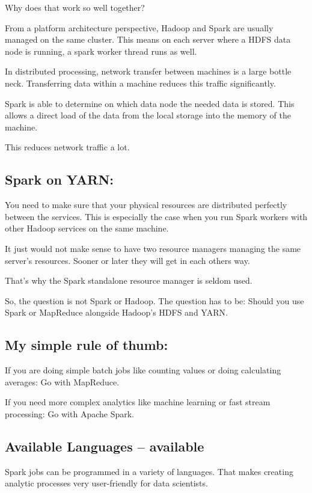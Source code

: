 \documentclass[12pt, numbers=noenddot]{scrreprt} %
\begin{document}
Why does that work so well together?

From a platform architecture perspective, Hadoop and Spark are usually managed on the same cluster. This means on each server where a HDFS data node is running, a spark worker thread runs as well.

In distributed processing, network transfer between machines is a large bottle neck. Transferring data within a machine reduces this traffic significantly.

Spark is able to determine on which data node the needed data is stored. This allows a direct load of the data from the local storage into the memory of the machine.

This reduces network traffic a lot.

\subsection{Spark on YARN:} You need to make sure that your physical resources are distributed perfectly between the services. This is especially the case when you run Spark workers with other Hadoop services on the same machine.

It just would not make sense to have two resource managers managing the same server’s resources. Sooner or later they will get in each others way.

That’s why the Spark standalone resource manager is seldom used.

So, the question is not Spark or Hadoop. The question has to be: Should you use Spark or MapReduce alongside Hadoop’s HDFS and YARN.

\subsection{My simple rule of thumb:}

If you are doing simple batch jobs like counting values or doing calculating averages: Go with MapReduce.

If you need more complex analytics like machine learning or fast stream processing: Go with Apache Spark.

\subsection{Available Languages -- available}

Spark jobs can be programmed in a variety of languages. That makes creating analytic processes very user-friendly for data scientists.
\end{document}
